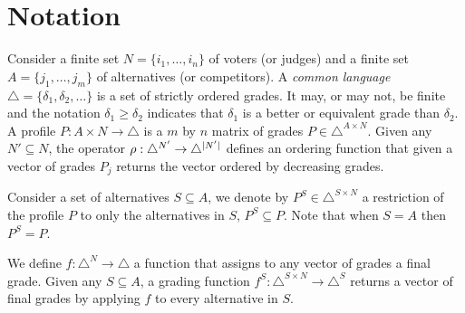 \section{Notation}
\label{sec:complete}
Consider a finite set $N=\{i_1, \dots, i_n\}$ of voters (or judges) and a finite set $A=\{j_1, \dots, j_m\}$ of alternatives (or competitors). 
A \textit{common language} $\triangle = \{ \delta_1, \delta_2, \dots \}$ is a set of strictly ordered grades. It may, or may not, be finite and the notation $\delta_1 \geq \delta_2$ indicates that $\delta_1$ is a better or equivalent grade than $\delta_2$. A profile $P : A\times N \rightarrow \triangle$ is a $m$ by $n$ matrix of grades $P \in \triangle^{A \times N}$. Given any $N'\subseteq N$, the operator $\rho: \triangle^{N'} \rightarrow \triangle^{\lvert N'\rvert}$ defines an ordering function that given a vector of grades $P_j$ returns the vector ordered by decreasing grades.

Consider a set of alternatives $S\subseteq A$,
we denote by $P^S \in \triangle^{S \times N}$ a restriction of the profile $P$ to only the alternatives in $S$, $P^S \subseteq P$. Note that when $S=A$ then $P^S=P$.

We define $f: \triangle^{N} \rightarrow \triangle$ a function that assigns to any vector of grades a final grade. Given any $S\subseteq A$, a grading function $f^S: \triangle^{S \times N} \rightarrow \triangle^S$ returns a vector of final grades by applying $f$ to every alternative in $S$.

